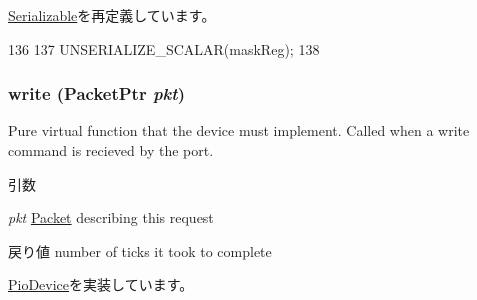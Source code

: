 \hyperlink{classSerializable_af100c4e9feabf3cd918619c88c718387}{Serializable}を再定義しています。


\begin{DoxyCode}
136 {
137     UNSERIALIZE_SCALAR(maskReg);
138 }
\end{DoxyCode}
\hypertarget{classX86ISA_1_1I8237_a4cefab464e72b5dd42c003a0a4341802}{
\subsubsection[{write}]{ write ({\bf PacketPtr} {\em pkt})}}
\label{classX86ISA_1_1I8237_a4cefab464e72b5dd42c003a0a4341802}
Pure virtual function that the device must implement. Called when a write command is recieved by the port. 
\begin{DoxyParams}{引数}
\item[{\em pkt}]\hyperlink{classPacket}{Packet} describing this request \end{DoxyParams}
\begin{DoxyReturn}{戻り値}
number of ticks it took to complete 
\end{DoxyReturn}


\hyperlink{classPioDevice_afe8371668d023bb2516b286e5e399b6f}{PioDevice}を実装しています。


